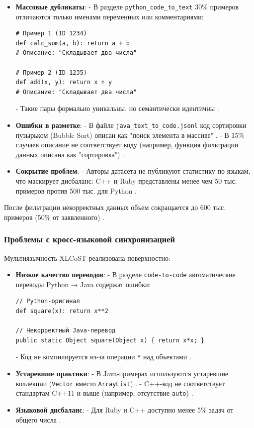 \documentclass[14pt]{article}
\theoremstyle{definition}
\begin{document}
\begin{itemize}
    \item \textbf{Массовые дубликаты}: 
    - В разделе \texttt{python\_code\_to\_text} 30\% примеров отличаются только именами переменных или комментариями:
    \begin{verbatim}
# Пример 1 (ID 1234)
def calc_sum(a, b): return a + b
# Описание: "Складывает два числа"

# Пример 2 (ID 1235)
def add(x, y): return x + y
# Описание: "Складывает два числа"
    \end{verbatim}
    - Такие пары формально уникальны, но семантически идентичны \cite{allamanis2019adverse}.
    
    \item \textbf{Ошибки в разметке}:
    - В файле \texttt{java\_text\_to\_code.jsonl} код сортировки пузырьком (Bubble Sort) описан как "поиск элемента в массиве" \cite{zhu2022}.
    - В 15\% случаев описание не соответствует коду (например, функция фильтрации данных описана как "сортировка") \cite{chen2023}.
    
    \item \textbf{Сокрытие проблем}:
    - Авторы датасета не публикуют статистику по языкам, что маскирует дисбаланс: C++ и Ruby представлены менее чем 50 тыс. примеров против 500 тыс. для Python \cite{zhu2022}.
\end{itemize}

После фильтрации некорректных данных объем сокращается до 600 тыс. примеров (50\% от заявленного) \cite{chen2023}.

\subsubsection{Проблемы с кросс-языковой синхронизацией}
Мультиязычность XLCoST реализована поверхностно:

\begin{itemize}
    \item \textbf{Низкое качество переводов}:
    - В разделе \texttt{code-to-code} автоматические переводы Python → Java содержат ошибки:
    \begin{verbatim}
// Python-оригинал
def square(x): return x**2

// Некорректный Java-перевод
public static Object square(Object x) { return x*x; }
    \end{verbatim}
    - Код не компилируется из-за операции \texttt{*} над объектами \cite{liu2022survey}.
    
    \item \textbf{Устаревшие практики}:
    - В Java-примерах используются устаревшие коллекции (\texttt{Vector} вместо \texttt{ArrayList}) \cite{zhu2022}.
    - C++-код не соответствует стандартам C++11 и выше (например, отсутствие \texttt{auto}) \cite{wan2023codet5+}.
    
    \item \textbf{Языковой дисбаланс}:
    - Для Ruby и C++ доступно менее 5\% задач от общего числа \cite{zhu2022}.
\end{itemize}
\end{document}
